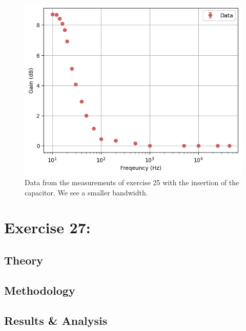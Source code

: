 \documentclass[%
reprint,
amsmath,amssymb,
aps,
floatfix
]{revtex4-2}
\begin{document}
		\begin{figure}
			\includegraphics[width=0.85\columnwidth]{ex25ResultsWithCapacitor.png}
			\caption{\label{fig:ex25ResultsWithCapacitor}Data from the measurements of exercise 25 with the insertion of the capacitor. We see a smaller bandwidth.}
		\end{figure}
		
	\section{Exercise 27: }
		\subsection{Theory}
		\subsection{Methodology}
		\subsection{Results \& Analysis}
		
	\clearpage
	
	\clearpage
	\onecolumngrid
	\appendix
\end{document}
